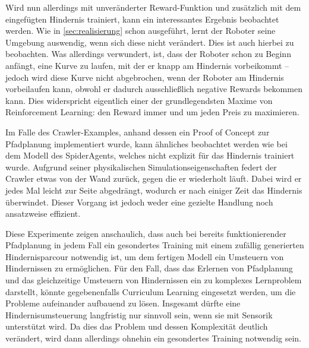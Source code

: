 Wird nun allerdings mit unveränderter Reward-Funktion und zusätzlich mit dem eingefügten Hindernis trainiert, kann ein interessantes Ergebnis beobachtet werden.
Wie in \autoref{sec:realisierung} schon ausgeführt, lernt der Roboter seine Umgebung auswendig, wenn sich diese nicht verändert.
Dies ist auch hierbei zu beobachten.
Was allerdings verwundert, ist, dass der Roboter schon zu Beginn anfängt, eine Kurve zu laufen, mit der er knapp am Hindernis vorbeikommt -- jedoch wird diese Kurve nicht abgebrochen, wenn der Roboter am Hindernis vorbeilaufen kann, obwohl er dadurch ausschließlich negative Rewards bekommen kann.
Dies widerspricht eigentlich einer der grundlegendsten Maxime von Reinforcement Learning: den Reward immer und um jeden Preis zu maximieren.

Im Falle des Crawler-Examples, anhand dessen ein Proof of Concept zur Pfadplanung implementiert wurde, kann ähnliches beobachtet werden wie bei dem Modell des SpiderAgents, welches nicht explizit für das Hindernis trainiert wurde.
Aufgrund seiner physikalischen Simulationseigenschaften federt der Crawler etwas von der Wand zurück, gegen die er wiederholt läuft.
Dabei wird er jedes Mal leicht zur Seite abgedrängt, wodurch er nach einiger Zeit das Hindernis überwindet.
Dieser Vorgang ist jedoch weder eine gezielte Handlung noch ansatzweise effizient.

Diese Experimente zeigen anschaulich, dass auch bei bereits funktionierender Pfadplanung in jedem Fall ein gesondertes Training mit einem zufällig generierten Hindernisparcour notwendig ist, um dem fertigen Modell ein Umsteuern von Hindernissen zu ermöglichen.
Für den Fall, dass das Erlernen von Pfadplanung und das gleichzeitige Umsteuern von Hindernissen ein zu komplexes Lernproblem darstellt, könnte gegebenenfalls Curriculum Learning eingesetzt werden, um die Probleme aufeinander aufbauend zu lösen.
Insgesamt dürfte eine Hindernisumsteuerung langfristig nur sinnvoll sein, wenn sie mit Sensorik unterstützt wird.
Da dies das Problem und dessen Komplexität deutlich verändert, wird dann allerdings ohnehin ein gesondertes Training notwendig sein.